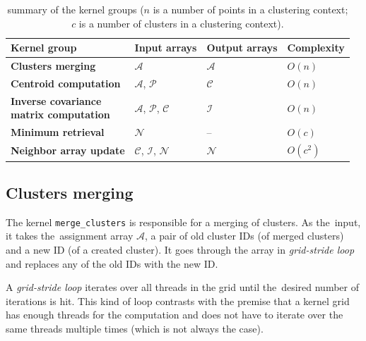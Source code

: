  \begin{table}
 	\centering
	\renewcommand{\arraystretch}{1.5}
 	\begin{tabular}{llll}
 		\toprule
 		\textbf{Kernel group}                  & {\textbf{Input arrays}} & \textbf{Output arrays}  & \textbf{Complexity} \\ \midrule
 		\textbf{Clusters merging}              &     $\mathcal{A}$       &     $\mathcal{A}$      &       $O(n)$        \\
 		\textbf{Centroid computation}          &     $\mathcal{A}$, $\mathcal{P}$       &  $\mathcal{C}$  &   $O(n)$\\
 		\parbox{10em}{\textbf{Inverse covariance\\ matrix computation}}            &  $\mathcal{A}$, $\mathcal{P}$, $\mathcal{C}$        &     $\mathcal{I}$                 &       $O(n)$ \\
 		\textbf{Minimum retrieval}             &     $\mathcal{N}$         & --     &       $O(c)$        \\
 		\textbf{Neighbor array update}         &    $\mathcal{C}$,    $\mathcal{I}$, $\mathcal{N}$        &     $\mathcal{N}$      &      $O(c^2)$       \\ \bottomrule
 	\end{tabular}
 	\caption{ summary of the kernel groups ($n$ is a number of points in a clustering context; $c$ is a number of clusters in a clustering context). }
 	\label{tab03:kernels}
 \end{table}

\subsection{Clusters merging}


The kernel \texttt{merge\_clusters} is responsible for a merging of clusters. As the~input, it takes the~assignment array $\mathcal{A}$, a pair of old cluster IDs (of merged clusters) and a new ID (of a created cluster). It goes through the array in  \emph{grid-stride loop} and replaces any of the old IDs with the new ID.

\begin{defn}
	A \emph{grid-stride loop} iterates over all threads in the grid until the~desired number of iterations is hit. This kind of loop contrasts with the premise that a kernel grid has enough threads for the computation and does not have to iterate over the same threads multiple times (which is not always the case). 
	\label{def03:grid-stride}
\end{defn}


